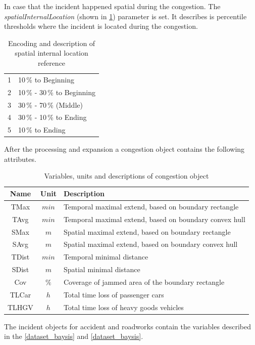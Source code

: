 In case that the incident happened spatial during the congestion. The \textit{spatialInternalLocation} (shown in \cref{tbl:jam_classification_ILS}) parameter is set. It describes is percentile thresholds where the incident is located during the congestion.
\begin{table}[ht!]
	\centering
	\begin{tabular}{c|l}  
		1 & 10\,\% to Beginning \\
 		2 & 10\,\% - 30\,\% to Beginning \\
 		3 & 30\,\% - 70\,\% (Middle) \\
 		4 & 30\,\% - 10\,\% to Ending \\
 		5 & 10\,\% to Ending \\
	\end{tabular}
	\caption{Encoding and description of spatial internal location reference}
	\label{tbl:jam_classification_ILS}
	\vspace{-4mm}
\end{table}
    
After the processing and expansion a congestion object contains the following attributes.
\begin{table}[ht!]
	\centering
	\begin{tabular}{c|c|l} 
		\toprule
		Name & Unit & Description \\
		\midrule 
		TMax  & $min$ & Temporal maximal extend, based on boundary rectangle \\
		TAvg  & $min$ & Temporal maximal extend, based on boundary convex hull \\
		SMax  & $m$   & Spatial maximal extend, based on boundary rectangle \\
		SAvg  & $m$   & Spatial maximal extend, based on boundary convex hull \\
		TDist & $min$ & Temporal minimal distance \\
		SDist & $m$   & Spatial minimal distance \\
		Cov   & $\%$  & Coverage of jammed area of the boundary rectangle \\
		TLCar & $h$   & Total time loss of passenger cars \\
		TLHGV & $h$   & Total time loss of heavy goods vehicles \\
		\bottomrule
	\end{tabular}
	\caption{Variables, units and descriptions of congestion object}
\end{table}

The incident objects for accident and roadworks contain the variables described in the \cref{dataset_baysis} and \cref{dataset_baysis}.

